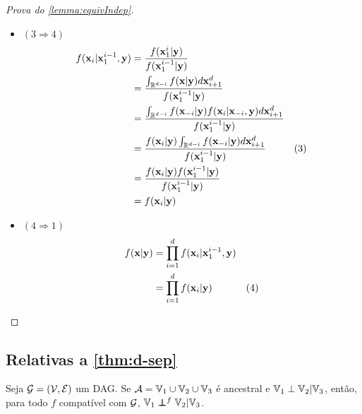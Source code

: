 \begin{proof}[Prova do \cref{lemma:equivIndep}]
\begin{itemize}
 \vspace{-5mm}
 \item $(3 \Longrightarrow 4)$
 \begin{align*}
  f(\x_i|\x_1^{i-1},\y)	
  &= \frac{f(\x_1^{i}|\y)}{f(\x_1^{i-1}|\y)} \\
	&= \frac{\int_{\mathbb{R}^{d-i}}{f(\x|\y)}d\x_{i+1}^{d}}
	{f(\x_1^{i-1}|\y)} \\
	&= \frac{\int_{\mathbb{R}^{d-i}}{f(\x_{-i}|\y)f(\x_i|\x_{-i},\y)d\x_{i+1}^{d}}}
	{f(\x_1^{i-1}|\y)} \\
	&= \frac{f(\x_i|\y)\int_{\mathbb{R}^{d-i}}{f(\x_{-i}|\y)d\x_{i+1}^{d}}}
	{f(\x_1^{i-1}|\y)} & (3) \\
	&= \frac{f(\x_i|\y)f(\x_1^{i-1}|\y)}
	{f(\x_1^{i-1}|\y)} \\
	&= f(\x_i|\y)
 \end{align*}

 \item $(4 \Longrightarrow 1)$
 \begin{align*}
  f(\x|\y)	
  &= \prod_{i=1}^{d}{f(\x_i|\x_1^{i-1},\y)} \\
	&= \prod_{i=1}^{d}{f(\x_i|\y)} & (4)
 \end{align*}
 \end{itemize}
\end{proof}

\subsection{Relativas a \cref{thm:d-sep}}

\begin{lemma}
 \label{lem:dsep_indep_anc}
 Seja $\sG = (\sV, \sE)$ um DAG.
 Se $\sA = \V_1 \cup \V_2 \cup \V_3$ é ancestral e
 $\V_1 \perp \V_2 | \V_3$, então, 
 para todo $f$ compatível com $\sG$,
 $\V_1 \ind^f \V_2 | \V_3$.
\end{lemma}

